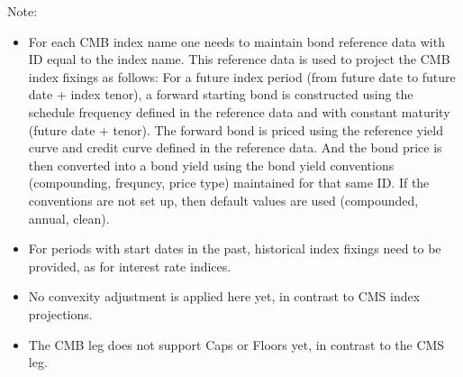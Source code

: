 Note:
\begin{itemize}
\item For each CMB index name one needs to maintain bond reference data with ID equal to the index name.
  This reference data is used to project the CMB index fixings as follows: For a future index period (from future date to future date + index tenor), a forward starting bond is constructed using the schedule frequency defined in the reference data and with constant maturity (future date + tenor).
  The forward bond is priced using the reference yield curve and credit curve defined in the reference data.
  And the bond price is then converted into a bond yield using the bond yield conventions (compounding, frequncy, price type) maintained for that same ID.
  If the conventions are not set up, then default values are used (compounded, annual, clean).
\item For periods with start dates in the past, historical index fixings need to be provided, as for interest rate indices.
\item No convexity adjustment is applied here yet, in contrast to CMS index projections.  
\item The CMB leg does not support Caps or Floors yet, in contrast to the CMS leg. 
\end{itemize}
